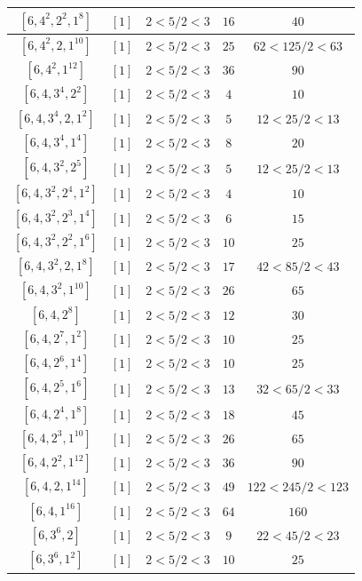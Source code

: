 \documentclass{article}%
\begin{document}
\begin{center}
\begin{longtable}{||c|c|c|c|c||}
$[6, 4^{2}, 2^{2}, 1^{8}]$ & $[1]$ & $2 < 5/2 < 3$ & $16$ & $40$ \\ \hline 
$[6, 4^{2}, 2, 1^{10}]$ & $[1]$ & $2 < 5/2 < 3$ & $25$ & $62 < 125/2 < 63$ \\ \hline 
$[6, 4^{2}, 1^{12}]$ & $[1]$ & $2 < 5/2 < 3$ & $36$ & $90$ \\ \hline 
$[6, 4, 3^{4}, 2^{2}]$ & $[1]$ & $2 < 5/2 < 3$ & $4$ & $10$ \\ \hline 
$[6, 4, 3^{4}, 2, 1^{2}]$ & $[1]$ & $2 < 5/2 < 3$ & $5$ & $12 < 25/2 < 13$ \\ \hline 
$[6, 4, 3^{4}, 1^{4}]$ & $[1]$ & $2 < 5/2 < 3$ & $8$ & $20$ \\ \hline 
$[6, 4, 3^{2}, 2^{5}]$ & $[1]$ & $2 < 5/2 < 3$ & $5$ & $12 < 25/2 < 13$ \\ \hline 
$[6, 4, 3^{2}, 2^{4}, 1^{2}]$ & $[1]$ & $2 < 5/2 < 3$ & $4$ & $10$ \\ \hline 
$[6, 4, 3^{2}, 2^{3}, 1^{4}]$ & $[1]$ & $2 < 5/2 < 3$ & $6$ & $15$ \\ \hline 
$[6, 4, 3^{2}, 2^{2}, 1^{6}]$ & $[1]$ & $2 < 5/2 < 3$ & $10$ & $25$ \\ \hline 
$[6, 4, 3^{2}, 2, 1^{8}]$ & $[1]$ & $2 < 5/2 < 3$ & $17$ & $42 < 85/2 < 43$ \\ \hline 
$[6, 4, 3^{2}, 1^{10}]$ & $[1]$ & $2 < 5/2 < 3$ & $26$ & $65$ \\ \hline 
$[6, 4, 2^{8}]$ & $[1]$ & $2 < 5/2 < 3$ & $12$ & $30$ \\ \hline 
$[6, 4, 2^{7}, 1^{2}]$ & $[1]$ & $2 < 5/2 < 3$ & $10$ & $25$ \\ \hline 
$[6, 4, 2^{6}, 1^{4}]$ & $[1]$ & $2 < 5/2 < 3$ & $10$ & $25$ \\ \hline 
$[6, 4, 2^{5}, 1^{6}]$ & $[1]$ & $2 < 5/2 < 3$ & $13$ & $32 < 65/2 < 33$ \\ \hline 
$[6, 4, 2^{4}, 1^{8}]$ & $[1]$ & $2 < 5/2 < 3$ & $18$ & $45$ \\ \hline 
$[6, 4, 2^{3}, 1^{10}]$ & $[1]$ & $2 < 5/2 < 3$ & $26$ & $65$ \\ \hline 
$[6, 4, 2^{2}, 1^{12}]$ & $[1]$ & $2 < 5/2 < 3$ & $36$ & $90$ \\ \hline 
$[6, 4, 2, 1^{14}]$ & $[1]$ & $2 < 5/2 < 3$ & $49$ & $122 < 245/2 < 123$ \\ \hline 
$[6, 4, 1^{16}]$ & $[1]$ & $2 < 5/2 < 3$ & $64$ & $160$ \\ \hline 
$[6, 3^{6}, 2]$ & $[1]$ & $2 < 5/2 < 3$ & $9$ & $22 < 45/2 < 23$ \\ \hline 
$[6, 3^{6}, 1^{2}]$ & $[1]$ & $2 < 5/2 < 3$ & $10$ & $25$ \\ \hline 

\end{longtable}
\end{center}
\end{document}
